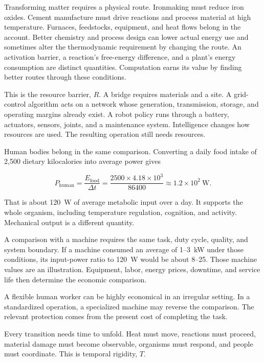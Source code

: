 
Transforming matter requires a physical route. Ironmaking must reduce iron oxides. Cement manufacture must drive reactions and process material at high temperature. Furnaces, feedstocks, equipment, and heat flows belong in the account. Better chemistry and process design can lower actual energy use and sometimes alter the thermodynamic requirement by changing the route. An activation barrier, a reaction's free-energy difference, and a plant's energy consumption are distinct quantities. Computation earns its value by finding better routes through these conditions.

This is the resource barrier, $R$. A bridge requires materials and a site. A grid-control algorithm acts on a network whose generation, transmission, storage, and operating margins already exist. A robot policy runs through a battery, actuators, sensors, joints, and a maintenance system. Intelligence changes how resources are used. The resulting operation still needs resources.

Human bodies belong in the same comparison. Converting a daily food intake of 2,500 dietary kilocalories into average power gives

\begin{equation}
P_{\mathrm{human}}
=\frac{E_{\mathrm{food}}}{\Delta t}
=\frac{2500\times4.18\times10^3}{86400}
\approx1.2\times10^2\ \mathrm{W}.
\end{equation}

That is about 120~W of average metabolic input over a day. It supports the whole organism, including temperature regulation, cognition, and activity. Mechanical output is a different quantity.

A comparison with a machine requires the same task, duty cycle, quality, and system boundary. If a machine consumed an average of 1--3~kW under those conditions, its input-power ratio to 120~W would be about 8--25. Those machine values are an illustration. Equipment, labor, energy prices, downtime, and service life then determine the economic comparison.

A flexible human worker can be highly economical in an irregular setting. In a standardized operation, a specialized machine may reverse the comparison. The relevant protection comes from the present cost of completing the task.


Every transition needs time to unfold. Heat must move, reactions must proceed, material damage must become observable, organisms must respond, and people must coordinate. This is temporal rigidity, $T$.

